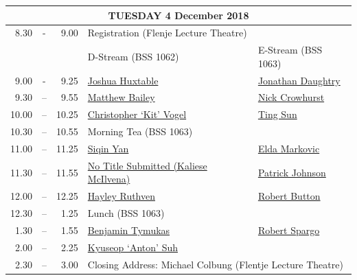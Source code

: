 \documentclass[twoside,12pt,a4paper,notitlepage]{memoir}
\begin{document}
\pagebreak
\vspace*{0cm}
\begin{center}
\begin{tabular}{rcr|p{3.6cm}|p{3.6cm}}
\multicolumn{5}{c}{{\large TUESDAY 4 December 2018}} \\ \hline
8.30 & - & 9.00 & \multicolumn{2}{l}{Registration (Flenje Lecture Theatre)} \\ \hline
 & & & D-Stream \hspace{1cm} (BSS 1062) & E-Stream \hspace{1cm} (BSS 1063) \\ \hline
9.00 & - & 9.25 &
 \hyperref[aut:huxtable]{Joshua Huxtable} &
 \hyperref[aut:daughtry]{Jonathan Daughtry} \\ \hline
9.30 & – & 9.55 &
 \hyperref[aut:bailey]{Matthew Bailey} &
 \hyperref[aut:crowhurst]{Nick Crowhurst} \\ \hline
10.00 & – & 10.25 &
\hyperref[aut:vogel]{Christopher `Kit' Vogel} &
\hyperref[aut:sun]{Ting Sun} \\ \hline
10.30 & – & 10.55 & \multicolumn{2}{l}{Morning Tea (BSS 1063)} \\ \hline
11.00 & – & 11.25 & 
 \hyperref[aut:yan]{Siqin Yan} &
 \hyperref[aut:markovic]{Elda Markovic} \\ \hline
11.30 & – & 11.55 &
 \hyperref[aut:mcilvena]{No Title Submitted (Kaliese McIlvena)} &
 \hyperref[aut:johnson]{Patrick Johnson} \\ \hline
12.00 & – & 12.25 &
 \hyperref[aut:ruthven]{Hayley Ruthven} &
 \hyperref[aut:button]{Robert Button} \\ \hline
12.30 & – & 1.25 & \multicolumn{2}{l}{Lunch (BSS 1063)} \\ \hline
1.30 & – & 1.55 &
 \hyperref[aut:tymukas]{Benjamin Tymukas} &
 \hyperref[aut:spargo]{Robert Spargo} \\ \hline
2.00 & – & 2.25 & 
\hyperref[aut:suh]{Kyuseop `Anton' Suh} & \\ \hline
2.30 & – & 3.00 & \multicolumn{2}{l}{Closing Address: Michael Colbung (Flentje Lecture Theatre)} \\ \hline
\end{tabular}
\end{center}
\end{document}
